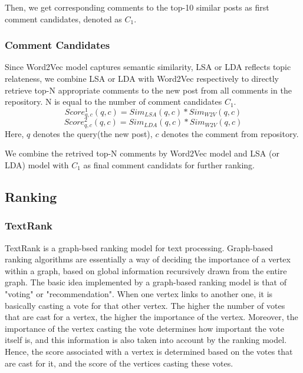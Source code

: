 \documentclass{sig-alternate}
\begin{document}
Then, we get corresponding comments to the top-10 similar posts as first comment candidates, denoted as $C_1$.

\subsubsection{Comment Candidates}
Since Word2Vec model captures semantic similarity, LSA or LDA reflects topic relateness, we combine LSA or LDA with Word2Vec respectively to directly retrieve top-N appropriate comments to the new post from all comments in the repository. N is equal to the number of comment candidates $C_1$. 
\begin{equation}
   Score_{q,c}^1(q, c) = Sim_{LSA}(q, c) * Sim_{W2V}(q, c)
\end{equation}
\begin{equation}
   Score_{q,c}^2(q, c) = Sim_{LDA}(q, c) * Sim_{W2V}(q, c)
\end{equation}
Here, $q$ denotes the query(the new post), $c$ denotes the comment from repository.

We combine the retrived top-N comments by Word2Vec model and LSA (or LDA) model with $C_1$ as final comment candidats for further ranking.

\subsection{Ranking}

\subsubsection{TextRank}

TextRank\cite{Mihalcea} is a graph-bsed ranking model for text processing. 
Graph-based ranking algorithms are essentially a
way of deciding the importance of a vertex within
a graph, based on global information recursively
drawn from the entire graph. The basic idea implemented
by a graph-based ranking model is that
of "voting" or "recommendation". When one vertex
links to another one, it is basically casting a vote
for that other vertex. The higher the number of votes
that are cast for a vertex, the higher the importance
of the vertex. Moreover, the importance of the vertex
casting the vote determines how important the vote
itself is, and this information is also taken into account
by the ranking model. Hence, the score associated
with a vertex is determined based on the votes
that are cast for it, and the score of the vertices casting
these votes.
\end{document}

